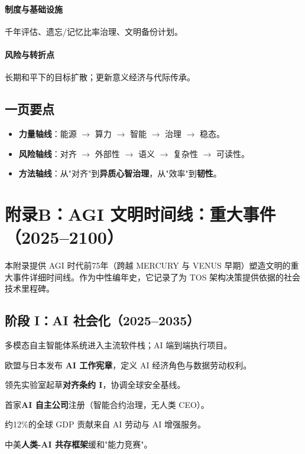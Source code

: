 \documentclass[11pt]{article}
\begin{document}
\paragraph{制度与基础设施} 千年评估、遗忘/记忆比率治理、文明备份计划。

\paragraph{风险与转折点} 长期和平下的目标扩散；更新意义经济与代际传承。

\subsection{一页要点}
\begin{itemize}[noitemsep]
  \item \textbf{力量轴线}：能源 $\rightarrow$ 算力 $\rightarrow$ 智能 $\rightarrow$ 治理 $\rightarrow$ 稳态。
  \item \textbf{风险轴线}：对齐 $\rightarrow$ 外部性 $\rightarrow$ 语义 $\rightarrow$ 复杂性 $\rightarrow$ 可读性。
  \item \textbf{方法轴线}：从"对齐"到\textbf{异质心智治理}，从"效率"到\textbf{韧性}。
\end{itemize}

\newpage

\section{附录B：AGI 文明时间线：重大事件（2025–2100）}
\label{appendix:timeline}

本附录提供 AGI 时代前75年（跨越 MERCURY 与 VENUS 早期）塑造文明的重大事件详细时间线。作为中性编年史，它记录了为 TOS 架构决策提供依据的社会技术里程碑。

\subsection{阶段 I：AI 社会化（2025–2035）}
\begin{description}[style=nextline,leftmargin=2cm]
  \item[2026] 多模态自主智能体系统进入主流软件栈；AI 端到端执行项目。
  \item[2028] 欧盟与日本发布 \textbf{AI 工作宪章}，定义 AI 经济角色与数据劳动权利。
  \item[2029] 领先实验室起草\textbf{对齐条约 I}，协调全球安全基线。
  \item[2030] 首家\textbf{AI 自主公司}注册（智能合约治理，无人类 CEO）。
  \item[2032] 约12\%的全球 GDP 贡献来自 AI 劳动与 AI 增强服务。
  \item[2034] 中美\textbf{人类-AI 共存框架}缓和"能力竞赛"。
\end{description}
\end{document}

